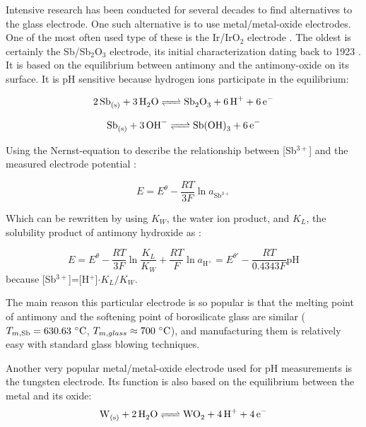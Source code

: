 \documentclass[manuscript=article, journal=jceda8]{achemso}
\begin{document}
Intensive research has been conducted for several decades to find alternatives to the glass electrode. One such alternative is to use metal/metal-oxide electrodes.
One of the most often used type of these is the Ir/IrO$_2$ electrode \cite{beyenal2004improved}.
The oldest is certainly the Sb/Sb$_2$O$_3$ electrode, its initial characterization dating back to 1923 \cite{uhl1923electrometric}.
It is based on the equilibrium between antimony and the antimony-oxide on its surface.
It is pH sensitive because hydrogen ions participate in the equilibrium:

\begin{equation}
        \ce{2Sb_{(s)} + 3H_2O <=> Sb_2O_3 + 6H^+ + 6e^-}
\end{equation}

\begin{equation}
        \ce{Sb_{(s)} + 3OH^- <=> Sb(OH)_3 + 6e^-}
\end{equation}

Using the Nernst-equation to describe the relationship between [Sb$^{3+}$] and the measured electrode potential \cite{kurzweil2009metal}:

\begin{equation}
E = E^\theta - \frac{RT}{3F}\ln a_{\textrm{Sb}^{3+}}
\end{equation}

Which can be rewritten by using $K_W$, the water ion product, and $K_L$, the solubility product of antimony hydroxide as \cite{kurzweil2009metal}:

\begin{equation}
E = E^\theta - \frac{RT}{3F}\ln \frac{K_L}{K_W} + \frac{RT}{F}\ln a_{\textrm{H}^+}
= E^{\theta '} - \frac{RT}{0.4343F} \textrm{pH}  
\end{equation}
because [Sb$^{3+}$]=[H$^+$]$\cdot K_L / K_W$.

The main reason this particular electrode is so popular is that the melting point of antimony and the softening point of borosilicate glass are similar ($T_{m, \textrm{Sb}} = 630.63~\celsius$, $T_{m, glass}\approx 700~\celsius$), and manufacturing them is relatively easy with standard glass blowing techniques.

Another very popular metal/metal-oxide electrode used for pH measurements is the tungsten electrode. Its function is also based on the equilibrium between the metal and its oxide:
\begin{equation}
        \ce{W_{(s)} + 2H_2O <=> WO_2 + 4H^+ + 4e^-}
\end{equation}
\end{document}
